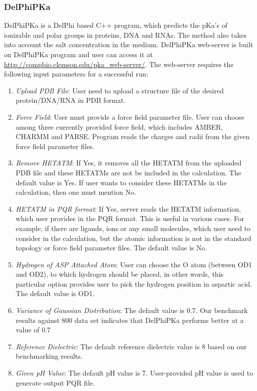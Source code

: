 \documentclass[9pt,tutorial]{livecoms}
\begin{document}
\subsubsection{DelPhiPKa}
DelPhiPKa\cite{wang2015pka} is a DelPhi based C++ program, which predicts the pKa’s of ionizable and polar groups in proteins, DNA and RNAs. The method also takes into account the salt concentration in the medium\cite{pahari2018delphipka}. DelPhiPKa web-server is built on DelPhiPKa program and user can access it at \url{http://compbio.clemson.edu/pka_web-server/}. The web-server requires the following input parameters for a successful run:
\begin{enumerate}
    \item \textit{ Upload PDB File}: User need to upload a structure file of the desired protein/DNA/RNA in PDB format.
    \item \textit{ Force Field}: User must provide a force field parameter file. User can choose among three currently provided force field, which includes AMBER, CHARMM and PARSE. Program reads the charges and radii from the given force field parameter files.
    \item \textit{ Remove HETATM}: If Yes, it removes all the HETATM from the uploaded PDB file and these HETATMs are not be included in the calculation. The default value is Yes. If user wants to consider these HETATMs in the calculation, then one must mention No.
    \item \textit{ HETATM in PQR format}: If Yes, server reads the HETATM information, which user provides in the PQR format. This is useful in various cases. For example, if there are ligands, ions or any small molecules, which user need to consider in the calculation, but the atomic information is not in the standard topology or force field parameter files. The default value is No. 
    \item \textit{ Hydrogen of ASP Attached Atom}: User can choose the O atom (between OD1 and OD2), to which hydrogen should be placed, in other words, this particular option provides user to pick the hydrogen position in aspartic acid. The default value is OD1.
    \item \textit{ Variance of Gaussian Distribution}: The default value is 0.7. Our benchmark results against 800 data set indicates that DelPhiPKa performs better at a value of 0.7 
    \item \textit{ Reference Dielectric}: The default reference dielectric value is 8 based on our benchmarking results. 
    \item \textit{ Given pH Value}: The default pH value is 7. User-provided pH value is used to generate output PQR file.

\end{enumerate}
\end{document}
